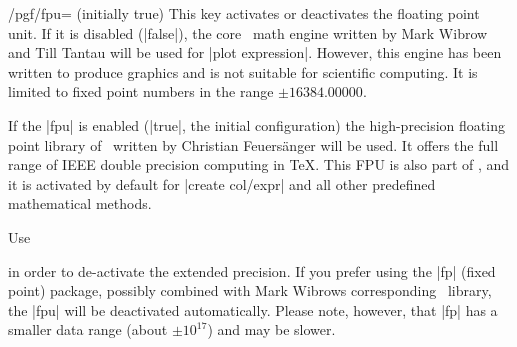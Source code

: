 \begin{key}{/pgf/fpu= (initially true)}
	This key activates or deactivates the floating point unit. If it is disabled (|false|), the core \PGF\ math engine written by Mark Wibrow and Till Tantau will be used for |plot expression|.
	However, this engine has been written to produce graphics and is not suitable for scientific computing. It is limited to fixed point numbers in the range $\pm 16384.00000$.

	If the |fpu| is enabled (|true|, the initial configuration) the high-precision floating point library of \PGF\ written by Christian Feuersänger will be used. It offers the full range of IEEE double precision computing in \TeX. This FPU is also part of \PGFPlotstable, and it is activated by default for |create col/expr| and all other predefined mathematical methods.

	Use
\begin{codeexample}
\end{codeexample}
	\noindent in order to de-activate the extended precision. If you prefer using the |fp| (fixed point) package, possibly combined with Mark Wibrows corresponding \PGF\ library, the |fpu| will be deactivated automatically. Please note, however, that |fp| has a smaller data range (about $\pm 10^{17}$) and may be slower.
\end{key}
